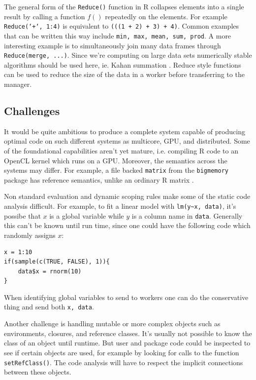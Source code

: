 \documentclass[12pt]{article}
\begin{document}
The general form of the \texttt{Reduce()} function in R collapses elements
into a single result by calling a function $f()$ repeatedly on the
elements. For example \texttt{Reduce(`+`, 1:4)} is equivalent to
\texttt{(((1 + 2) + 3) + 4)}. Common examples that can be written this way
include \texttt{min, max, mean, sum, prod}. A more interesting example is
to simultaneously join many data frames through \texttt{Reduce(merge,
...)}.  Since we're computing on large data sets numerically stable
algorithms should be used here, ie.  Kahan summation \cite{Robey2011217}.
Reduce style functions can be used to reduce the size of the data in a
worker before transferring to the manager.

\subsection{Challenges}

It would be quite ambitious to produce a complete system capable of
producing optimal code on such different systems as multicore, GPU, and
distributed. Some of the foundational capabilities aren't yet mature, i.e.
compiling R code to an OpenCL kernel which runs on a GPU. Moreover, the
semantics across the systems may differ. For example, a file backed
\texttt{matrix} from the \texttt{bigmemory} package has reference
semantics, unlike an ordinary R matrix \cite{bigmemory}.

Non standard evaluation and dynamic scoping rules make some of the
static code analysis difficult. For example, to fit a linear model with
\texttt{lm(y\textasciitilde x, data)}, it's possibe that $x$ is a global variable while
$y$ is a column name in \texttt{data}. Generally this can't be known until
run time, since one could have the following code which randomly assigns
$x$:

\begin{verbatim}
x = 1:10
if(sample(c(TRUE, FALSE), 1)){
    data$x = rnorm(10)
}
\end{verbatim}

When identifying global variables to send to workers one can do the
conservative thing and send both \texttt{x, data}.

Another challenge is handling mutable or more complex objects
such as environments, closures, and reference classes.  It's usually not
possible to know the class of an object until runtime. But user and package
code could be inspected to see if certain objects are used, for example by
looking for calls to the function \texttt{setRefClass()}. The code
analysis will have to respect the implicit connections between these
objects.
\end{document}
